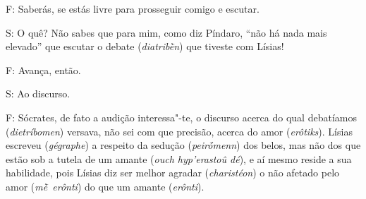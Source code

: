F: Saberás, se estás livre para prosseguir comigo e escutar.

 

S: O quê? Não sabes que para mim, como diz Píndaro, ``não há nada mais
elevado''
que escutar o debate (\emph{diatribḕn}) que tiveste com Lísias!

F: Avança, então.

 

\bekker{[227c]} S: Ao discurso.

 

F: Sócrates, de fato a audição interessa"-te, o discurso acerca do qual
debatíamos (\emph{dietríbomen}) versava, não sei com que precisão,
acerca do amor (\emph{erôtiks}). Lísias escreveu (\emph{gégraphe}) a
respeito da sedução (\emph{peirṓmenn}) dos belos, mas não dos que estão
sob a tutela de um amante (\emph{ouch hyp'erastoû dé}), e aí mesmo
reside a sua habilidade, pois Lísias diz ser melhor agradar
(\emph{charistéon}) o não afetado pelo amor (\emph{mḕ~erônti}) do que um
amante (\emph{erônti}).

 

